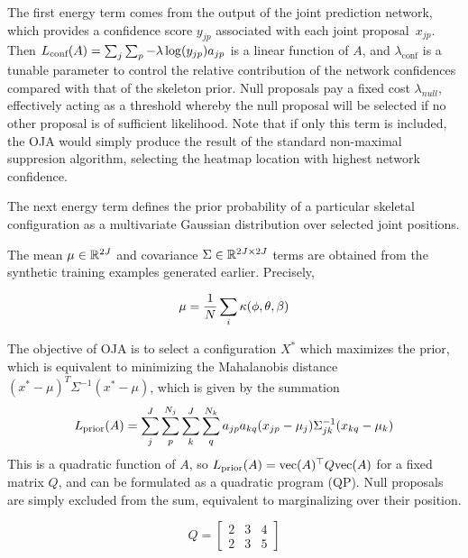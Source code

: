 The first energy term comes from the output of the joint prediction network, which provides a confidence score $y_{jp}$ associated with each joint proposal~$x_{jp}$.  Then $L_{\textrm{conf}}(A) = \sum_j\sum_p -\lambda\log(y_{jp}) a_{jp}$ is a linear function of $A$, 
and $\lambda_{\text{conf}}$ is a tunable parameter to control the relative contribution of the network confidences compared with that of the skeleton prior.
Null proposals pay a fixed cost $\lambda_{null}$, effectively acting as a threshold whereby the null proposal will be selected if no other proposal is of sufficient likelihood. Note that if only this term is included, the OJA would simply produce the result of the standard non-maximal suppresion algorithm, selecting the heatmap location with highest network confidence.

 The next energy term defines the prior probability of a particular skeletal configuration as a multivariate Gaussian distribution over selected joint positions.

The mean $\mu \in {\mathbb{R}^{2J}}$ and covariance $\Sigma \in {\mathbb{R}^{2J\times 2J}}$ terms are obtained from the synthetic training examples generated earlier. Precisely, 

\begin{equation}
    \mu = \frac{1}{N} \sum_{i} \kappa(\phi, \theta, \beta)
\end{equation}

The objective of OJA is to select a configuration $X^*$ which maximizes the prior, which is equivalent to minimizing the Mahalanobis distance
$(x^*-\mu)^T\Sigma^{-1}(x^*-\mu)$, which is given by the summation
\begin{equation}
L_{\textrm{prior}}(A) = \sum_j^J\sum_p^{N_j}\sum_k^J\sum_q^{N_k}a_{jp}a_{kq}(x_{jp} - \mu_j)\Sigma_{jk}^{-1}(x_{kq}-\mu_k)
\end{equation}
This is a quadratic function of $A$, so $L_{\textrm{prior}}(A) = \text{vec}(A)^\top Q \text{vec}(A)$ for a fixed matrix $Q$, and can be formulated as a quadratic program (QP).  Null proposals are simply excluded from the sum, equivalent to marginalizing over their position. 

\begin{equation}
    Q = \begin{bmatrix}
        2 & 3 & 4 \\
        2 & 3 & 5
    \end{bmatrix}
\end{equation}


